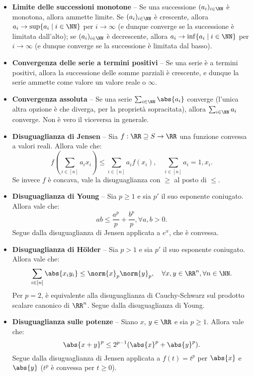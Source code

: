 \begin{multicols*}{2}
\begin{itemize}
    \item \textbf{Limite delle successioni monotone} -- Se una successione
    $(a_i)_{i \in \NN}$ è monotona, allora ammette limite. Se $(a_i)_{i \in \NN}$
    è crescente, allora $a_i \to \sup\{a_i \mid i \in \NN\}$ per $i \to \infty$ (e
    dunque converge se la successione è limitata dall'alto); se
    $(a_i)_{i \in \NN}$ è decrescente, allora $a_i \to \inf\{a_i \mid i \in \NN\}$ per $i \to \infty$ (e dunque converge se la successione è limitata dal basso).
    \item \textbf{Convergenza delle serie a termini positivi} -- Se una serie è
    a termini positivi, allora la successione delle somme parziali è crescente,
    e dunque la serie ammette come valore un valore reale o $\infty$.
    \item \textbf{Convergenza assoluta} -- Se una serie $\sum_{i \in \NN} \abs{a_i}$ converge
    (l'unica altra opzione è che diverga, per la proprietà sopracitata), allora
    $\sum_{i \in \NN} a_i$ converge. Non è vero il viceversa in generale.
    \item \textbf{Disuguaglianza di Jensen} -- Sia $f : \RR \supseteq S \to \RR$ una funzione convessa a
    valori reali. Allora vale che:
    \[
        f\left(\sum_{i \in [n]} a_i x_i\right) \leq \sum_{i \in [n]} a_i f(x_i), \quad \sum_{i \in [n]} a_i = 1, x_i.
    \]
    Se invece $f$ è concava, vale la disuguaglianza con $\geq$ al posto di $\leq$.
    \item \textbf{Disuguaglianza di Young} -- Sia $p \geq 1$ e sia $p'$ il
    suo esponente coniugato. Allora vale che:
    \[
        ab \leq \frac{a^p}{p} + \frac{b^p}{p}, \forall a, b > 0.
    \]
    Segue dalla disuguaglianza di Jensen applicata a $e^x$, che è convessa.
    \item \textbf{Disuguaglianza di Hölder} -- Sia $p > 1$ e sia $p'$ il
    suo esponente coniugato. Allora vale che:
    \[
        \sum_{i \in [n]} \abs{x_i y_i} \leq \norm{x}_p \norm{y}_p, \quad \forall x, y \in \RR^n, \forall n \in \NN.
    \]
    Per $p = 2$, è equivalente alla disuguaglianza di Cauchy-Schwarz sul
    prodotto scalare canonico di $\RR^n$. Segue dalla disuguaglianza di Young.
    \item \textbf{Disuguaglianza sulle potenze} -- Siano $x$, $y \in \RR$ e sia
    $p \geq 1$. Allora vale che:
    \[
        \abs{x+y}^p \leq 2^{p-1} (\abs{x}^p + \abs{y}^p).
    \]
    Segue dalla disuguaglianza di Jensen applicata a $f(t) = t^p$ per
    $\abs{x}$ e $\abs{y}$ ($t^p$ è convessa per $t \geq 0$).

\end{itemize}
\end{multicols*}
